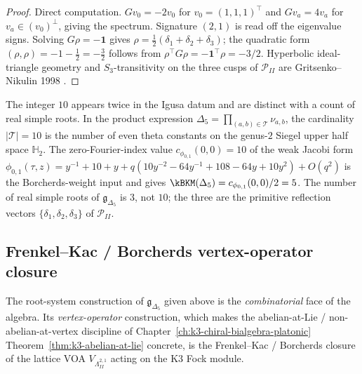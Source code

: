 \begin{proof}[Proof]
Direct computation. $G v_0 = -2 v_0$ for $v_0 = (1, 1, 1)^\top$ and $G v_a = 4 v_a$ for $v_a \in (v_0)^\perp$, giving the spectrum. Signature $(2, 1)$ is read off the eigenvalue signs. Solving $G \rho = -\mathbf{1}$ gives $\rho = \tfrac{1}{2}(\delta_1 + \delta_2 + \delta_3)$; the quadratic form $(\rho, \rho) = -1 - \tfrac{1}{2} = -\tfrac{3}{2}$ follows from $\rho^\top G \rho = -\mathbf{1}^\top \rho = -3/2$. Hyperbolic ideal-triangle geometry and $S_3$-transitivity on the three cusps of $\mathcal{P}_{II}$ are Gritsenko--Nikulin 1998 \cite[\S2--3]{GritsenkoNikulin1998}.
\end{proof}

\begin{remark}
\label{rem:k3e-ten-is-not-real-simples}
The integer $10$ appears twice in the Igusa datum and are distinct with a count of real simple roots. In the product expression $\Delta_5 = \prod_{(a,b) \in \mathcal{T}} \nu_{a,b}$, the cardinality $|\mathcal{T}| = 10$ is the number of even theta constants on the genus-$2$ Siegel upper half space $\mathbb{H}_2$. The zero-Fourier-index value $c_{\phi_{0,1}}(0, 0) = 10$ of the weak Jacobi form $\phi_{0,1}(\tau,z)=y^{-1}+10+y+q(10y^{-2}-64y^{-1}+108-64y+10y^2)+O(q^2)$ is the Borcherds-weight input and gives $\kBKM(\Delta_5) = c_{\phi_{0,1}}(0, 0)/2 = 5$. The number of real simple roots of $\mathfrak{g}_{\Delta_5}$ is $3$, not $10$; the three are the primitive reflection vectors $\{\delta_1, \delta_2, \delta_3\}$ of $\mathcal{P}_{II}$.
\end{remark}

\subsection{Frenkel--Kac / Borcherds vertex-operator closure}
\label{subsec:k3e-frenkel-kac-closure}

The root-system construction of $\mathfrak{g}_{\Delta_5}$ given above is the
\emph{combinatorial} face of the algebra. Its \emph{vertex-operator} construction,
which makes the abelian-at-Lie / non-abelian-at-vertex discipline of
Chapter~\ref{ch:k3-chiral-bialgebra-platonic}
Theorem~\ref{thm:k3-abelian-at-lie} concrete, is the Frenkel--Kac / Borcherds
closure of the lattice VOA $V_{\Lambda^{2,1}_{II}}$ acting on the K3 Fock
module.

